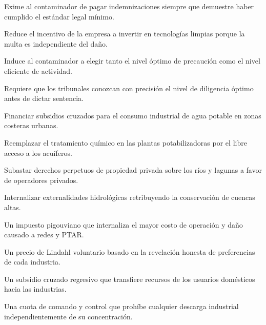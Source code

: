 \begin{opts}
    \item Exime al contaminador de pagar indemnizaciones siempre que demuestre haber cumplido el estándar legal mínimo.
    \item Reduce el incentivo de la empresa a invertir en tecnologías limpias porque la multa es independiente del daño.
    \item Induce al contaminador a elegir tanto el nivel óptimo de precaución como el nivel eficiente de actividad.
    \item Requiere que los tribunales conozcan con precisión el nivel de diligencia óptimo antes de dictar sentencia.
\end{opts}

\begin{opts}
    \item Financiar subsidios cruzados para el consumo industrial de agua potable en zonas costeras urbanas.
    \item Reemplazar el tratamiento químico en las plantas potabilizadoras por el libre acceso a los acuíferos.
    \item Subastar derechos perpetuos de propiedad privada sobre los ríos y lagunas a favor de operadores privados.
    \item Internalizar externalidades hidrológicas retribuyendo la conservación de cuencas altas.
\end{opts}

\begin{opts}
    \item Un impuesto pigouviano que internaliza el mayor costo de operación y daño causado a redes y PTAR.
    \item Un precio de Lindahl voluntario basado en la revelación honesta de preferencias de cada industria.
    \item Un subsidio cruzado regresivo que transfiere recursos de los usuarios domésticos hacia las industrias.
    \item Una cuota de comando y control que prohíbe cualquier descarga industrial independientemente de su concentración.
\end{opts}

